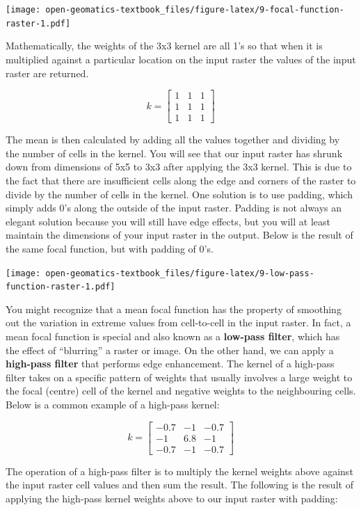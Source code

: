 \documentclass[
]{book}
\begin{document}
\texttt{[image: open-geomatics-textbook\_files/figure-latex/9-focal-function-raster-1.pdf]}

Mathematically, the weights of the 3x3 kernel are all 1's so that when it is multiplied against a particular location on the input raster the values of the input raster are returned.

\[k = \begin{bmatrix}1 & 1 & 1\\
1 & 1 & 1\\
1 & 1 & 1
\end{bmatrix}\]

The mean is then calculated by adding all the values together and dividing by the number of cells in the kernel. You will see that our input raster has shrunk down from dimensions of 5x5 to 3x3 after applying the 3x3 kernel. This is due to the fact that there are insufficient cells along the edge and corners of the raster to divide by the number of cells in the kernel. One solution is to use padding, which simply adds 0's along the outside of the input raster. Padding is not always an elegant solution because you will still have edge effects, but you will at least maintain the dimensions of your input raster in the output. Below is the result of the same focal function, but with padding of 0's.

\texttt{[image: open-geomatics-textbook\_files/figure-latex/9-low-pass-function-raster-1.pdf]}

You might recognize that a mean focal function has the property of smoothing out the variation in extreme values from cell-to-cell in the input raster. In fact, a mean focal function is special and also known as a \textbf{low-pass filter}, which has the effect of ``blurring'' a raster or image. On the other hand, we can apply a \textbf{high-pass filter} that performs edge enhancement. The kernel of a high-pass filter takes on a specific pattern of weights that usually involves a large weight to the focal (centre) cell of the kernel and negative weights to the neighbouring cells. Below is a common example of a high-pass kernel:

\[k = \begin{bmatrix}-0.7 & -1 & -0.7\\
-1 & 6.8 & -1\\
-0.7 & -1 & -0.7
\end{bmatrix}\]

The operation of a high-pass filter is to multiply the kernel weights above against the input raster cell values and then sum the result. The following is the result of applying the high-pass kernel weights above to our input raster with padding:
\end{document}
